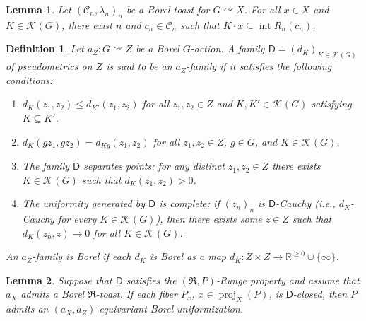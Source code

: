 \documentclass[10pt,a4paper]{amsart}
\newtheorem{definition}{Definition}
\newtheorem{lemma}{Lemma}
\newcommand{\R}{\mathbb{R}}
\newcommand{\acts}{\curvearrowright}
\DeclareMathOperator{\inter}{\mathrm{int}}
\newcommand{\mfR}{\mathfrak{R}}
\DeclareMathOperator{\proj}{\mathrm{proj}}
\newcommand{\unifm}{\mathsf{D}}
\newcommand{\vietoris}[2][]{\mathcal{K}_{#1}(#2)}
\begin{document}
\begin{lemma}
  \label{lem:exhaustive-taust}
  Let \((\mathcal{C}_{n},\lambda_{n})_{n}\) be a Borel toast for \(G \acts X\).  For all \(x \in X\)
  and \(K \in \vietoris{G}\), there exist \(n\) and \(c_{n} \in \mathcal{C}_{n}\) such that
  \(K \cdot x \subseteq \inter R_{n}(c_{n})\).
\end{lemma}

\begin{definition}
  \label{def:U-family}
  Let \(a_{Z} : G \acts Z\) be a Borel \(G\)-action.  A family
  \(\unifm = (d_{K})_{K \in \vietoris{G}}\) of pseudometrics on \(Z\) is said to be an
  \emph{\(a_{Z}\)-family} if it satisfies the following conditions:
  \begin{enumerate}[leftmargin=1cm, label={\sf \arabic*}., ref={\sf \arabic*}]
  \item\label{item:unif-monotone} \(d_{K}(z_{1},z_{2}) \le d_{K'}(z_{1}, z_{2})\) for all
    \(z_{1}, z_{2} \in Z\) and \(K, K' \in \vietoris{G}\) satisfying \(K \subseteq K'\).
  \item\label{item:unif-shift} \(d_{K}(gz_{1}, gz_{2}) = d_{Kg}(z_{1},z_{2})\) for all
    \(z_{1},z_{2} \in Z\), \(g \in G\), and \(K \in \vietoris{G}\).
  \item\label{item:unif-hausdorff} The family \(\unifm\) separates points: for any distinct
    \(z_{1}, z_{2} \in Z\) there exists \(K \in \vietoris{G}\) such that
    \(d_{K}(z_{1}, z_{2}) > 0\).
  \item\label{item:unif-complete} The uniformity generated by \( \unifm \) is complete: if
    \((z_{n})_{n}\) is \(\unifm\)-Cauchy (i.e., \(d_{K}\)-Cauchy for every \(K \in \vietoris{G}\)),
    then there exists some \(z \in Z\) such that \(d_{K}(z_{n},z) \to 0\) for all
    \(K \in \vietoris{G}\).
  \end{enumerate}
  An \(a_{Z}\)-family is \emph{Borel} if each \(d_{K}\) is Borel as a map
  \(d_{K} : Z \times Z \to \R^{\ge 0} \cup \{\infty\}\).
\end{definition}

\begin{lemma}
  \label{lem:runge-equivariant-uniformization}
  Suppose that \(\unifm\) satisfies the \((\mfR, P)\)-Runge property and assume that \(a_{X}\)
  admits a Borel \(\mfR\)-toast.  If each fiber \(P_{x}\), \(x \in \proj_{X}(P)\), is
  \(\unifm\)-closed, then \(P\) admits an \((a_{X}, a_{Z})\)-equivariant Borel uniformization.
\end{lemma}
\end{document}
